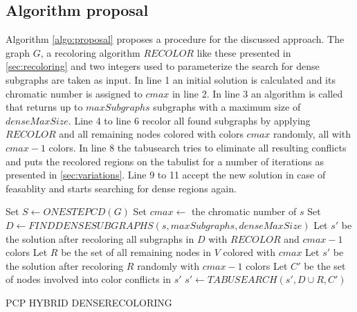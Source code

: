 \subsection{Algorithm proposal}
Algorithm \ref{algo:proposal} proposes a procedure for the discussed approach. The graph $G$, a recoloring algorithm $\mathit{RECOLOR}$ like these presented in \ref{sec:recoloring} and two integers used to parameterize the search for dense subgraphs are taken as input. In line 1 an initial solution is calculated and its chromatic number is assigned to $cmax$ in line 2. In line 3 an algorithm is called that returns up to $\mathit{maxSubgraphs}$ subgraphs with a maximum size of $\mathit{denseMaxSize}$. Line 4 to line 6 recolor all found subgraphs by applying $\mathit{RECOLOR}$ and all remaining nodes colored with colors $\mathit{cmax}$ randomly, all with $\mathit{cmax-1}$ colors. In line 8 the tabusearch tries to eliminate all resulting conflicts and puts the recolored regions on the tabulist for a number of iterations as presented in \ref{sec:variations}. Line 9 to 11 accept the new solution in case of feasablity and starts searching for dense regions again.

\begin{algorithm}
Set $S \gets \mathit{ONESTEPCD}(G)$\;
Set $cmax \gets$ the chromatic number of $s$\;
Set $D \gets \mathit{FINDDENSESUBGRAPHS}( s, \mathit{maxSubgraphs}, \mathit{denseMaxSize}) $\;
Let $s'$ be the solution after recoloring all subgraphs in $D$ with $\mathit{RECOLOR}$ and $cmax-1$ colors\;
Let $R$ be the set of all remaining nodes in $V$ colored with $cmax$\;
Let $s'$ be the solution after recoloring $R$ randomly with $cmax-1$ colors\;
Let $C'$ be the set of nodes involved into color conflicts in $s'$\;
$s' \gets \mathit{TABUSEARCH}(s', D \cup R, C')$\;
\;
\caption{PCP HYBRID DENSERECOLORING}
\label{algo:proposal}
\end{algorithm}




